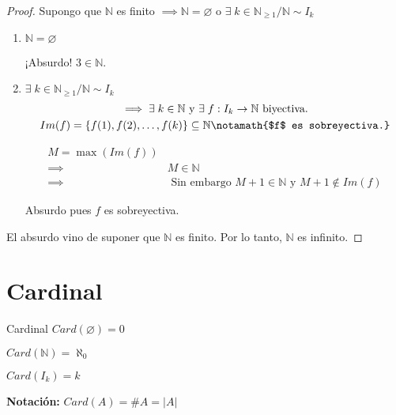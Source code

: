 \begin{proof}\phantom{.}

    Supongo que $\mathbb{N}$ es finito $\implies \mathbb{N} = \varnothing$ o
    $\exists \; k \in \mathbb{N}_{\geq 1} / \mathbb{N} \sim I_k$

    \begin{enumerate}[%
                labelindent=*,
                style=multiline,
                leftmargin=*,
                align=left,
                leftmargin=2\parindent,
                label=Caso \arabic*)]

        \item $\mathbb{N} = \varnothing$ 

            ¡Absurdo! $3 \in \mathbb{N}$.

        \item $\exists \; k \in \mathbb{N}_{\geq 1} / 
                \mathbb{N} \sim I_k$
            \begin{gather*}
                \implies \exists \; k \in \mathbb{N} \text{ y } 
                \exists \; f: I_k \to \mathbb{N} \text{ biyectiva.} \\
                Im(f) = \{f(1), f(2), \dotsc, f(k)\} \subseteq \mathbb{N}
                \notamath{$f$ es sobreyectiva.}
            \end{gather*}

            \begin{align*}
                M = \max{(Im(f))} & \\
                \implies& M \in \mathbb{N} \\
                \implies& \text{ Sin embargo } 
                M+1 \in \mathbb{N} \text{ y }  
                M + 1 \notin Im(f) 
            \end{align*}

        Absurdo pues $f$ es sobreyectiva.
    \end{enumerate}


    El absurdo vino de suponer que $\mathbb{N}$ es finito. Por lo tanto, 
    $\mathbb{N}$ es infinito.

\end{proof}

\section{Cardinal}

\begin{definicion}{Cardinal}{}
     $Card(\varnothing) = 0$

     $Card(\mathbb{N}) = \aleph_0$ %

     $Card(I_k) = k$ %

    \bigskip
    \textbf{Notación:} $Card(A) = \# A = | A |$
\end{definicion}


